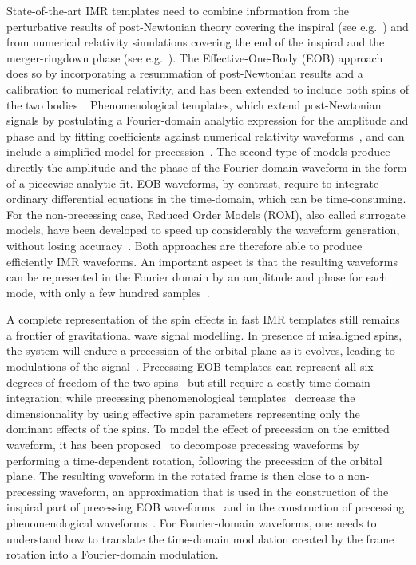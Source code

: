 \documentclass[aps,showpacs,%
prd,superscriptaddress,nofootinbib]{revtex4}
\begin{document}
State-of-the-art IMR templates need to combine information from the perturbative results of post-Newtonian theory covering the inspiral (see e.g.~\cite{BlanchetLiving}) and from numerical relativity simulations covering the end of the inspiral and the merger-ringdown phase (see e.g.~\cite{Pfeiffer12}). The Effective-One-Body (EOB) approach~\cite{BD99} does so by incorporating a resummation of post-Newtonian results and a calibration to numerical relativity, and has been extended to include both spins of the two bodies~\cite{Taracchini+13, Pan+13, Bohe+16}. Phenomenological templates, which extend post-Newtonian signals by postulating a Fourier-domain analytic expression for the amplitude and phase and by fitting coefficients against numerical relativity waveforms~\cite{Husa+15, Khan+15}, and can include a simplified model for precession~\cite{Hannam+13}. The second type of models produce directly the amplitude and the phase of the Fourier-domain waveform in the form of a piecewise analytic fit. EOB waveforms, by contrast, require to integrate ordinary differential equations in the time-domain, which can be time-consuming. For the non-precessing case, Reduced Order Models (ROM), also called surrogate models, have been developed to speed up considerably the waveform generation, without losing accuracy~\cite{Field+13, Puerrer14, Bohe+16}. Both approaches are therefore able to produce efficiently IMR waveforms. An important aspect is that the resulting waveforms can be represented in the Fourier domain by an amplitude and phase for each mode, with only a few hundred samples~\cite{Puerrer14}.

A complete representation of the spin effects in fast IMR templates still remains a frontier of gravitational wave signal modelling. In presence of misaligned spins, the system will endure a precession of the orbital plane as it evolves, leading to modulations of the signal~\cite{ACST94}. Precessing EOB templates can represent all six degrees of freedom of the two spins~\cite{Pan+13, BTB16} but still require a costly time-domain integration; while precessing phenomenological templates~\cite{Hannam+13} decrease the dimensionnality by using effective spin parameters representing only the dominant effects of the spins. To model the effect of precession on the emitted waveform, it has been proposed~\cite{BCV03b, BCPTV05, Schmidt+10, OShaughnessy+11, Boyle+11} to decompose precessing waveforms by performing a time-dependent rotation, following the precession of the orbital plane. The resulting waveform in the rotated frame is then close to a non-precessing waveform, an approximation that is used in the construction of the inspiral part of precessing EOB waveforms~\cite{Pan+13} and in the construction of precessing phenomenological waveforms~\cite{Hannam+13}. For Fourier-domain waveforms, one needs to understand how to translate the time-domain modulation created by the frame rotation into a Fourier-domain modulation.
\end{document}
